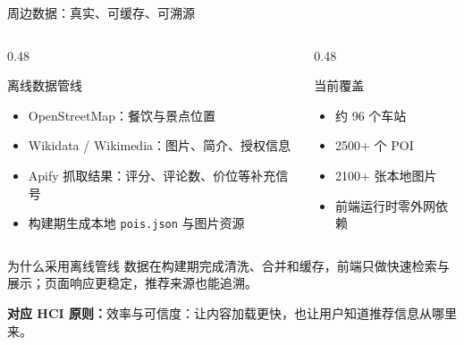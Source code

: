 \documentclass[aspectratio=169,10pt]{beamer}
\newcommand{\hciprinciple}[1]{\vspace{0.25em}\textcolor{MTRPurple}{\small\textbf{对应 HCI 原则：}#1}}
\begin{document}
\begin{frame}{周边数据：真实、可缓存、可溯源}
  \begin{columns}[T,onlytextwidth]
    \begin{column}{0.48\textwidth}
      \begin{block}{离线数据管线}
        \begin{itemize}
          \item OpenStreetMap：餐饮与景点位置
          \item Wikidata / Wikimedia：图片、简介、授权信息
          \item Apify 抓取结果：评分、评论数、价位等补充信号
          \item 构建期生成本地 \texttt{pois.json} 与图片资源
        \end{itemize}
      \end{block}
    \end{column}
    \begin{column}{0.48\textwidth}
      \begin{block}{当前覆盖}
        \begin{itemize}
          \item 约 96 个车站
          \item 2500+ 个 POI
          \item 2100+ 张本地图片
          \item 前端运行时零外网依赖
        \end{itemize}
      \end{block}
    \end{column}
  \end{columns}
  \vspace{0.4em}
  \begin{block}{为什么采用离线管线}
    \small 数据在构建期完成清洗、合并和缓存，前端只做快速检索与展示；页面响应更稳定，推荐来源也能追溯。
  \end{block}
  \hciprinciple{效率与可信度：让内容加载更快，也让用户知道推荐信息从哪里来。}
\end{frame}
\end{document}
